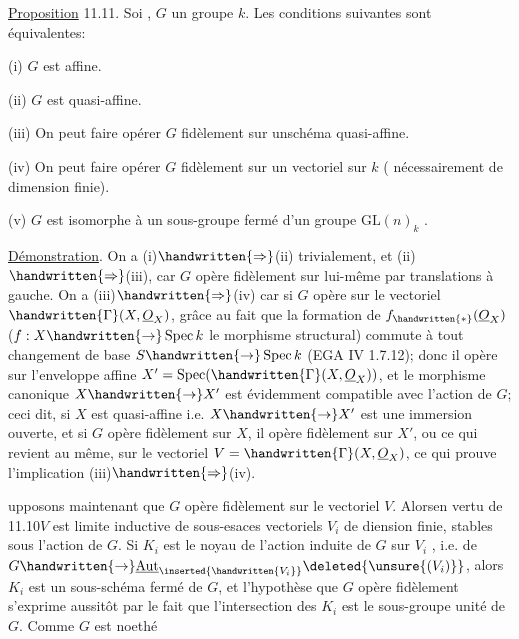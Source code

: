 \uline{Proposition} 11.11. Soi , $G$ un groupe  $k$. Les conditions suivantes sont équivalentes:

(i) $G$ est affine.

(ii) $G$ est quasi-affine.

(iii) On peut faire opérer $G$ fidèlement sur unschéma quasi-affine.

(iv) On peut faire opérer $G$ fidèlement sur un vectoriel sur $k$ ( nécessairement de dimension finie).

(v)  $G$ est isomorphe à un sous-groupe fermé d'un groupe $\mathrm{GL}(n)_k$ .

\uline{Démonstration}. On a (i)$\handwritten{\Rightarrow}$(ii) trivialement, et (ii)$\handwritten{\Rightarrow}$(iii), car $G$ opère fidèlement sur lui-même par translations à gauche. On a (iii)$\handwritten{\Rightarrow}$(iv) car si $G$ opère  sur le vectoriel $\handwritten{\Gamma}(X,\underline{O}_X)$, grâce au fait que la formation de $f_{\handwritten{*}}(\underline{O}_X)$ ($f:X\handwritten{\to}\operatorname{Spec}k$ le morphisme structural) commute à tout changement de base $S\handwritten{\to}\operatorname{Spec}k$ (EGA IV 1.7.12); donc il opère sur l'enveloppe affine $X'=\operatorname{Spec}(\handwritten{\Gamma}(X,\underline{O}_X))$, et le morphisme canonique $X\handwritten{\to}X'$ est évidemment compatible avec l'action de $G$; ceci dit, si $X$ est quasi-affine i.e. $X\handwritten{\to}X'$ est une immersion ouverte, et si $G$ opère fidèlement sur $X$, il opère fidèlement sur $X'$, ou ce qui revient au même, sur le vectoriel $V=\handwritten{\Gamma}(X,\underline{O}_X)$, ce qui prouve l'implication (iii)$\handwritten{\Rightarrow}$(iv).

upposons maintenant  que $G$ opère fidèlement sur le vectoriel $V$. Alors\handwritten{,}en vertu de 11.10\handwritten{,}$V$ est limite inductive de sous-esaces vectoriels $V_i$ de diension finie, stables sous l'action de $G$. Si $K_i$ est le noyau de l'action induite de $G$ sur $V_i$ , i.e. de $G\handwritten{\to}\underline{\operatorname{Aut}}_{\inserted{\handwritten{V_i}}}\deleted{\unsure{(V_i)}}$, alors $K_i$ est un sous-schéma fermé de $G$, et l'hypothèse que $G$ opère fidèlement s'exprime aussitôt par le fait que  l'intersection des $K_i$ est le sous-groupe unité de $G$. Comme $G$ est noethé%
